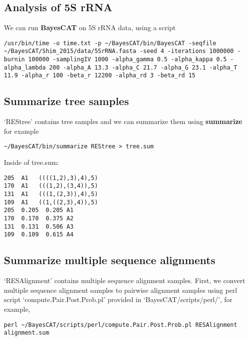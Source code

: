 \documentclass[11pt]{article}
\begin{document}
\subsection{Analysis of 5S rRNA}
\label{sec-3-1}
We can run \textbf{BayesCAT} on 5S rRNA data, using a script  
\begin{lstlisting}
/usr/bin/time -o time.txt -p ~/BayesCAT/bin/BayesCAT -seqfile ~/BayesCAT/Shim_2015/data/5SrRNA.fasta -seed 4 -iterations 1000000 -burnin 100000 -samplingIV 1000 -alpha_gamma 0.5 -alpha_kappa 0.5 -alpha_lambda 200 -alpha_A 13.3 -alpha_C 21.7 -alpha_G 23.1 -alpha_T 11.9 -alpha_r 100 -beta_r 12200 -alpha_rd 3 -beta_rd 15
\end{lstlisting}

\subsection{Summarize tree samples}
\label{sec-3-2}
`REStree' contains tree samples and we can summarize them using \textbf{summarize} for example
\begin{lstlisting}
~/BayesCAT/bin/summarize REStree > tree.sum
\end{lstlisting}

Inside of tree.sum:
\begin{lstlisting}
205  A1   ((((1,2),3),4),5)
170  A1   (((1,2),(3,4)),5)
131  A1   (((1,(2,3)),4),5)
109  A1   ((1,((2,3),4)),5)
205  0.205  0.205 A1
170  0.170  0.375 A2
131  0.131  0.506 A3
109  0.109  0.615 A4
\end{lstlisting}

\subsection{Summarize multiple sequence alignments}
\label{sec-3-3}
`RESAlignment' contains multiple sequence alignment samples. First, we convert multiple sequence alignment samples to pairwise alignment samples using perl script `compute.Pair.Post.Prob.pl' provided in `BayesCAT/scripts/perl/', for example,
\begin{lstlisting}
perl ~/BayesCAT/scripts/perl/compute.Pair.Post.Prob.pl RESAlignment alignment.sum
\end{lstlisting}
\end{document}
